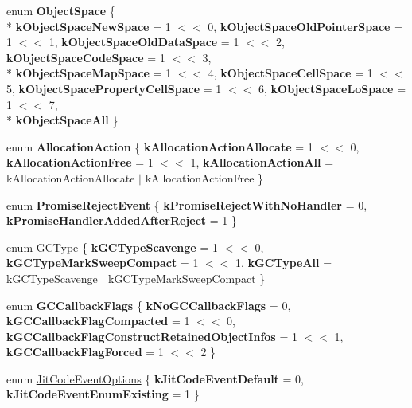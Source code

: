 \begin{DoxyCompactItemize}
\item 
\hypertarget{namespacev8_ae7bc5b0bd1100e94d78de255daa8ebc3}{}enum {\bfseries Object\+Space} \{ \\*
{\bfseries k\+Object\+Space\+New\+Space} = 1 $<$$<$ 0, 
{\bfseries k\+Object\+Space\+Old\+Pointer\+Space} = 1 $<$$<$ 1, 
{\bfseries k\+Object\+Space\+Old\+Data\+Space} = 1 $<$$<$ 2, 
{\bfseries k\+Object\+Space\+Code\+Space} = 1 $<$$<$ 3, 
\\*
{\bfseries k\+Object\+Space\+Map\+Space} = 1 $<$$<$ 4, 
{\bfseries k\+Object\+Space\+Cell\+Space} = 1 $<$$<$ 5, 
{\bfseries k\+Object\+Space\+Property\+Cell\+Space} = 1 $<$$<$ 6, 
{\bfseries k\+Object\+Space\+Lo\+Space} = 1 $<$$<$ 7, 
\\*
{\bfseries k\+Object\+Space\+All}
 \}\label{namespacev8_ae7bc5b0bd1100e94d78de255daa8ebc3}

\item 
\hypertarget{namespacev8_ae2b70dd2abba164d9ad9ffc9f757eca9}{}enum {\bfseries Allocation\+Action} \{ {\bfseries k\+Allocation\+Action\+Allocate} = 1 $<$$<$ 0, 
{\bfseries k\+Allocation\+Action\+Free} = 1 $<$$<$ 1, 
{\bfseries k\+Allocation\+Action\+All} = k\+Allocation\+Action\+Allocate $\vert$ k\+Allocation\+Action\+Free
 \}\label{namespacev8_ae2b70dd2abba164d9ad9ffc9f757eca9}

\item 
\hypertarget{namespacev8_a307b3674d4966684f8170a4fbd932eaf}{}enum {\bfseries Promise\+Reject\+Event} \{ {\bfseries k\+Promise\+Reject\+With\+No\+Handler} = 0, 
{\bfseries k\+Promise\+Handler\+Added\+After\+Reject} = 1
 \}\label{namespacev8_a307b3674d4966684f8170a4fbd932eaf}

\item 
enum \hyperlink{namespacev8_ac109d6f27e0c0f9ef4e98bcf7a806cf2}{G\+C\+Type} \{ {\bfseries k\+G\+C\+Type\+Scavenge} = 1 $<$$<$ 0, 
{\bfseries k\+G\+C\+Type\+Mark\+Sweep\+Compact} = 1 $<$$<$ 1, 
{\bfseries k\+G\+C\+Type\+All} = k\+G\+C\+Type\+Scavenge $\vert$ k\+G\+C\+Type\+Mark\+Sweep\+Compact
 \}
\item 
\hypertarget{namespacev8_a247c37a849f4d6c293b9b16e94e1944b}{}enum {\bfseries G\+C\+Callback\+Flags} \{ {\bfseries k\+No\+G\+C\+Callback\+Flags} = 0, 
{\bfseries k\+G\+C\+Callback\+Flag\+Compacted} = 1 $<$$<$ 0, 
{\bfseries k\+G\+C\+Callback\+Flag\+Construct\+Retained\+Object\+Infos} = 1 $<$$<$ 1, 
{\bfseries k\+G\+C\+Callback\+Flag\+Forced} = 1 $<$$<$ 2
 \}\label{namespacev8_a247c37a849f4d6c293b9b16e94e1944b}

\item 
enum \hyperlink{namespacev8_a06f34fa4fa4cfc8518366808d1d461c1}{Jit\+Code\+Event\+Options} \{ {\bfseries k\+Jit\+Code\+Event\+Default} = 0, 
{\bfseries k\+Jit\+Code\+Event\+Enum\+Existing} = 1
 \}
\end{DoxyCompactItemize}
